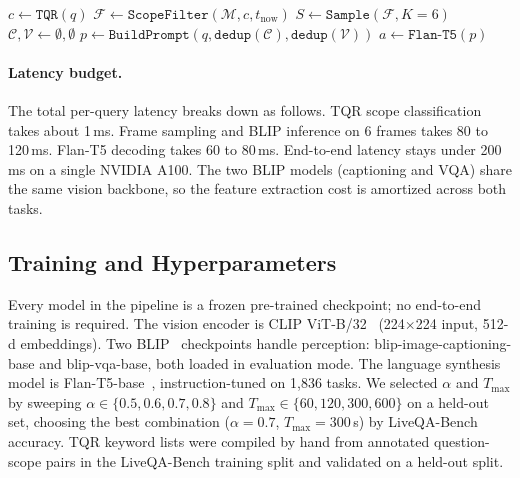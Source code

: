 \begin{algorithm}[t]
\SetAlgoLined
{}
$c \leftarrow \texttt{TQR}(q)$ 
$\mathcal{F} \leftarrow \texttt{ScopeFilter}(\mathcal{M}, c, t_{\text{now}})$\;
$S \leftarrow \texttt{Sample}(\mathcal{F}, K\!=\!6)$\;
$\mathcal{C}, \mathcal{V} \leftarrow \emptyset, \emptyset$\;
$p \leftarrow \texttt{BuildPrompt}(q, \texttt{dedup}(\mathcal{C}), \texttt{dedup}(\mathcal{V}))$\;
$a \leftarrow \texttt{Flan-T5}(p)$\;
\caption{Stream-Fused Generator}
\label{alg:sfg}
\end{algorithm}

\paragraph{Latency budget.}
The total per-query latency breaks down as follows. TQR scope classification takes about 1\,ms. Frame sampling and BLIP inference on 6 frames takes 80 to 120\,ms. Flan-T5 decoding takes 60 to 80\,ms.
End-to-end latency stays under 200\,ms on a single NVIDIA A100. The two BLIP models (captioning and VQA) share the same vision backbone, so the feature extraction cost is amortized across both tasks.


\subsection{Training and Hyperparameters}
\label{sec:training}

Every model in the pipeline is a frozen pre-trained checkpoint; no end-to-end training is required.
The vision encoder is CLIP ViT-B/32~\cite{radford2021clip} (224$\times$224 input, 512-d embeddings).
Two BLIP~\cite{li2022blip} checkpoints handle perception: blip-image-captioning-base and blip-vqa-base, both loaded in evaluation mode.
The language synthesis model is Flan-T5-base~\cite{chung2022flanT5}, instruction-tuned on 1,836 tasks.
We selected $\alpha$ and $T_{\max}$ by sweeping $\alpha \in \{0.5, 0.6, 0.7, 0.8\}$ and $T_{\max} \in \{60, 120, 300, 600\}$ on a held-out set, choosing the best combination ($\alpha = 0.7$, $T_{\max} = 300$\,s) by LiveQA-Bench accuracy.
TQR keyword lists were compiled by hand from annotated question-scope pairs in the LiveQA-Bench training split and validated on a held-out split.

